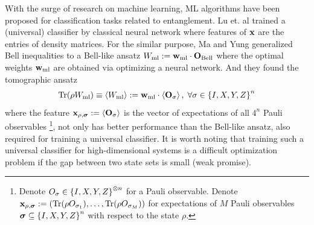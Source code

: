 \documentclass[
aps,
pra,
twocolumn,
floatfix,
]{revtex4-2}
\theoremstyle{plain}
\theoremstyle{definition}
\newcommand{\ew}{W}
\newcommand{\pob}{O}
\newcommand{\dm}{\rho}
\newcommand{\ml}{\text{ml}}
\newcommand{\bellineq}{\textup{Bell}}
\newcommand{\sx}{\hat{\sigma}_x}
\newcommand{\sy}{\hat{\sigma}_y}
\newcommand{\sz}{\hat{\sigma}_z}
\newcommand{\bmsigma}{\bm{\sigma}}
\begin{document}
With the surge of research on machine learning, ML algorithms have been proposed for classification tasks related to entanglement.
Lu et. al \cite{luSeparabilityEntanglementClassifierMachine2018} 
trained a (universal)  classifier by classical neural network
where features of $\vb{x}$ are the entries of density matrices.
For the similar purpose, Ma and Yung \cite{maTransformingBellInequalities2018} generalized Bell inequalities to a Bell-like ansatz $\ew_{\ml}:=\vbw_{\ml}\cdot\vb{\pob}_{\bellineq}$ where the optimal weights $\vbw_{\ml}$ are obtained via optimizing a neural network.
And they found the tomographic ansatz
\begin{equation}
	\Tr(\dm\ew_{\ml}) \equiv\expval{\ew_{\ml}} := 
	\vbw_{\ml} \cdot \expval{\vb{\pob}_{\sigma}}, 
	\; \forall \sigma \in  \qty{I,X,Y,Z}^n
	\label{eq:tomographic_ansatz}
\end{equation}
where the feature $\vbx_{\dm,\bmsigma}:=\expval{\vb{\pob}_{\sigma}}$ is the vector of expectations of all $4^n$ Pauli observables
\footnote{
	Denote $\pob_{\sigma}\in \qty{I,X,Y,Z}^{\otimes n}$ for a Pauli observable.
	Denote $\vbx_{\dm,\bmsigma}:=(\Tr(\dm\pob_{\sigma_1}),\dots,\Tr(\dm\pob_{\sigma_M}))$ for expectations of $M$ Pauli observables $\bmsigma\subseteq \qty{I,X,Y,Z}^n$ with respect to the state $\dm$. 
},
not only has better performance than the Bell-like ansatz, 
also required \cite{luTomographyNecessaryUniversal2016} for training a universal  classifier.
It is worth noting that training such a universal classifier for high-dimensional systems is a difficult optimization problem if the gap between two state sets is small (weak promise).
\end{document}
